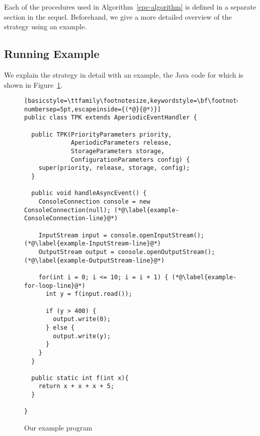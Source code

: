 Each of the procedures used in Algorithm~\ref{epc-algorithm} is
defined in a separate section in the sequel.
Beforehand, we give a more detailed overview of the strategy using an
example.

\subsection{Running Example}
\label{overview-subsection}

We explain the strategy in detail with an example, the Java code for
which is shown in Figure~\ref{example-code-figure}.
\begin{figure}[t!]
  \begin{center}
  \begin{minipage}{10cm}
  \begin{lstlisting}[basicstyle=\ttfamily\footnotesize,keywordstyle=\bf\footnotesize,language=Java,numbers=left,numberstyle=\tiny,stepnumber=1, numbersep=5pt,escapeinside={(*@}{@*)}]
public class TPK extends AperiodicEventHandler {

  public TPK(PriorityParameters priority,
             AperiodicParameters release,
             StorageParameters storage,
             ConfigurationParameters config) {
    super(priority, release, storage, config);
  }
      
  public void handleAsyncEvent() {
    ConsoleConnection console = new ConsoleConnection(null); (*@\label{example-ConsoleConnection-line}@*)
        
    InputStream input = console.openInputStream(); (*@\label{example-InputStream-line}@*)
    OutputStream output = console.openOutputStream(); (*@\label{example-OutputStream-line}@*)
        
    for(int i = 0; i <= 10; i = i + 1) { (*@\label{example-for-loop-line}@*)
      int y = f(input.read());
          
      if (y > 400) {
        output.write(0);
      } else {
        output.write(y);
      }
    }
  }
      
  public static int f(int x){
    return x + x + x + 5;
  }
      
}
\end{lstlisting}
\end{minipage}
\end{center}
  \caption{Our example program}
  \label{example-code-figure}
\end{figure}
